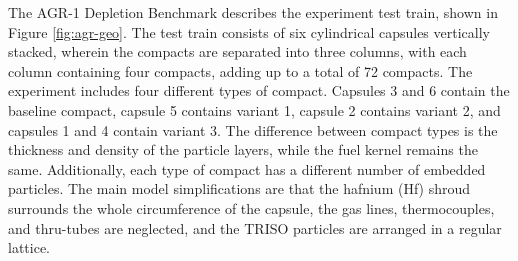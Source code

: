 The AGR-1 Depletion Benchmark \cite{sterbentz_agr1_2018} describes the experiment test train, shown in Figure \ref{fig:agr-geo}.
The test train consists of six cylindrical capsules vertically stacked, wherein the compacts are separated into three columns, with each column containing four compacts, adding up to a total of 72 compacts.
The experiment includes four different types of compact.
Capsules 3 and 6 contain the baseline compact, capsule 5 contains variant 1, capsule 2 contains variant 2, and capsules 1 and 4 contain variant 3.
The difference between compact types is the thickness and density of the particle layers, while the fuel kernel remains the same.
Additionally, each type of compact has a different number of embedded particles.
The main model simplifications are that the hafnium (Hf) shroud surrounds the whole circumference of the capsule, the gas lines, thermocouples, and thru-tubes are neglected, and the TRISO particles are arranged in a regular lattice.

